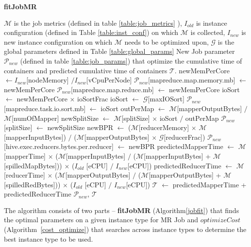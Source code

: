 \begin{algorithm}
	\caption{\textbf{fitJobMR}}\label{jobfit}
	\begin{algorithmic}[1]
		\footnotesize
		\REQUIRE  $\mathcal{M}$ is the job metrics (defined in table \ref{table:job_metrics} ), $I_{old}$  is instance configuration (defined in Table \ref{table:inst_conf}) on which $\mathcal{M}$ is collected, $I_{new}$ is new instance configuration on which $\mathcal{M}$ needs to be optimized upon, $\mathcal{G}$ is the global parameters defined in Table \ref{table:global_params}
		\ENSURE New Job parameter $\mathcal{P}_{new}$ (defined in table \ref{table:job_params}) that optimize the cumulative time of containers and predicted cumulative time of containers $\mathcal{T}$.
		\STATE newMemPerCore $\gets I_{new}$[nodeMemory] $/ I_{new}$[vCpuPerNode]
		\STATE $\mathcal{P}_{new}$[mapreduce.map.memory.mb] $\gets$ newMemPerCore
		\STATE $\mathcal{P}_{new}$[mapreduce.map.reduce.mb] $\gets$ newMemPerCore
		\STATE ioSort $\gets$ newMemPerCore $\times$ ioSortFrac
		\STATE ioSort $\gets$ $\mathcal{G}$[maxIOSort]
		\ENDIF
		\STATE $\mathcal{P}_{new}$[mapreduce.task.io.sort.mb] $\gets$ ioSort
		\STATE outPerMap $\gets$ $\mathcal{M}$[mapperOutputBytes] $/$ $\mathcal{M}$[numOfMapper]
		\STATE newSplitSize $\gets$ $\mathcal{M}$[splitSize] $\times$ ioSort $/$ outPerMap
		\STATE $\mathcal{P}_{new}$[splitSize] $\gets$ newSplitSize
		\STATE newBPR $\gets$ ($\mathcal{M}$[reducerMemory] $\times$ $\mathcal{M}$[mapperInputBytes]) $/$ ($\mathcal{M}$[mapperOutputBytes] $\times$ $\mathcal{G}$[reducerFrac])  
		\STATE $\mathcal{P}_{new}$[hive.exec.reducers.bytes.per.reducer] $\gets$ newBPR
		\STATE predictedMapperTime $\gets$ $\mathcal{M}$[mapperTime] $\times$ ($\mathcal{M}$[mapperInputBytes] $/$ ($\mathcal{M}$[mapperInputBytes] + $\mathcal{M}$[spilledMapBytes])) $\times$ ($I_{old}$ [eCPU] $/$ $I_{new}$[eCPU])
		\STATE predictedReducerTime $\gets$ $\mathcal{M}$[reducerTime] $\times$ ($\mathcal{M}$[mapperOutputBytes] $/$ ($\mathcal{M}$[mapperOutputBytes] + $\mathcal{M}$[spilledRedBytes])) $\times$ ($I_{old}$ [eCPU] $/$ $I_{new}$[eCPU])
		\STATE $\mathcal{T}$ $\gets$ predictedMapperTime + predictedReducerTime
		\STATE \RETURN $\mathcal{P}_{new}$, $\mathcal{T}$
	\end{algorithmic}
\end{algorithm}

The algorithm consists of two parts -- \textbf{fitJobMR} (Algorithm\ref{jobfit}) that finds the optimal parameters on a given instance type for MR Job and $optimizeCost$ (Algorithm~\ref{cost_optimize}) that searches across instance types to determine the best instance type to be used. 

